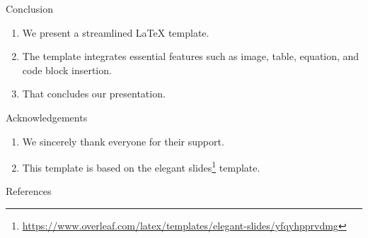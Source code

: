 \documentclass[8pt]{beamer}
\begin{document}
\begin{frame}{\insertsection}{\insertsubsection}
    \begin{block}{Conclusion}
        \begin{enumerate}
            \item We present a streamlined \LaTeX{} template.
            \item The template integrates essential features such as image, table, equation, and code block insertion.
            \item That concludes our presentation.
        \end{enumerate}
    \end{block}

    \begin{block}{Acknowledgements}
        \begin{enumerate}
            \item We sincerely thank everyone for their support.
            \item This template is based on the elegant slides\footnote{\url{https://www.overleaf.com/latex/templates/elegant-slides/yfqyhpprvdmg}} template.
        \end{enumerate}
    \end{block}
\end{frame}

\begin{frame}{References}
    \printbibliography
\end{frame}
\end{document}
